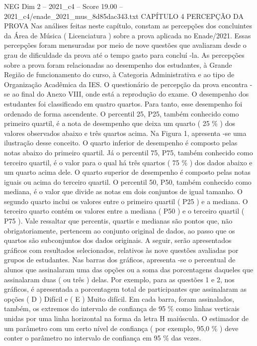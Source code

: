 \begin{textsample}{NEG Dim 2 – 2021\_c4 – Score 19.00 – 2021\_c4/enade\_2021\_mus\_8d85dac343.txt}  \label{ex:f2_neg_403}
CAPÍTULO 4 PERCEPÇÃO DA PROVA Nas análises feitas neste capítulo, constam as percepções dos concluintes da Área de Música ( Licenciatura ) sobre a prova aplicada no Enade/2021.
Essas percepções foram mensuradas por meio de nove questões que avaliaram desde o grau de dificuldade da prova até o tempo gasto para concluí -la.
As percepções sobre a prova foram relacionadas ao desempenho dos estudantes, à Grande Região de funcionamento do curso, à Categoria Administrativa e ao tipo de Organização Acadêmica da IES.
O questionário de percepção da prova encontra -se ao final do Anexo VIII, onde está a reprodução do exame.
O desempenho dos estudantes foi classificado em quatro quartos.
Para tanto, esse desempenho foi ordenado de forma ascendente.
O percentil 25, P25, também conhecido como primeiro quartil, é a nota de desempenho que deixa um quarto ( 25 \% ) dos valores observados abaixo e três quartos acima.
Na Figura 1, apresenta -se uma ilustração desse conceito.
O quarto inferior de desempenho é composto pelas notas abaixo do primeiro quartil.
Já o percentil 75, P75, também conhecido como terceiro quartil, é o valor para o qual há três quartos ( 75 \% ) dos dados abaixo e um quarto acima dele.
O quarto superior de desempenho é composto pelas notas iguais ou acima do terceiro quartil.
O percentil 50, P50, também conhecido como mediana, é o valor que divide as notas em dois conjuntos de igual tamanho.
O segundo quarto inclui os valores entre o primeiro quartil ( P25 ) e a mediana.
O terceiro quarto contém os valores entre a mediana ( P50 ) e o terceiro quartil ( P75 ).
Vale ressaltar que percentis, quartis e medianas são pontos que, não obrigatoriamente, pertencem ao conjunto original de dados, ao passo que os quartos são subconjuntos dos dados originais.
A seguir, serão apresentados gráficos com resultados selecionados, relativos às nove questões avaliadas por grupos de estudantes.
Nas barras dos gráficos, apresenta -se o percentual de alunos que assinalaram uma das opções ou a soma das porcentagens daqueles que assinalaram duas ( ou três ) delas.
Por exemplo, para as questões 1 e 2, nos gráficos, é apresentada a porcentagem total de participantes que assinalaram as opções ( D ) Difícil e ( E ) Muito difícil.
Em cada barra, foram assinalados, também, os extremos do intervalo de confiança de 95 \% como linhas verticais unidas por uma linha horizontal na forma da letra H maiúscula.
O estimador de um parâmetro com um certo nível de confiança ( por exemplo, 95,0 \% ) deve conter o parâmetro no intervalo de confiança em 95 \% das vezes.

\end{textsample}
